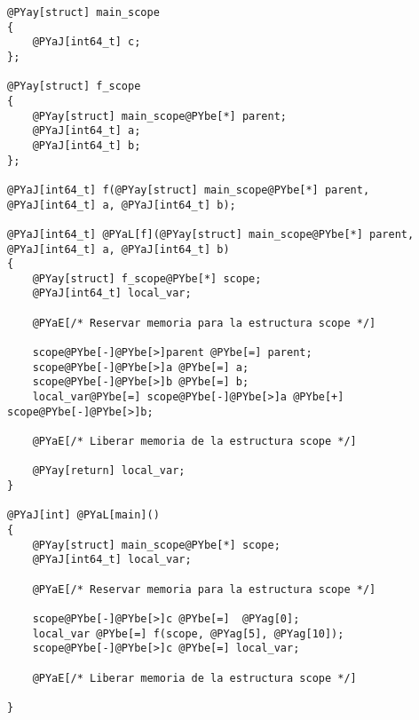 \begin{Verbatim}[commandchars=@\[\]]
@PYay[struct] main_scope
{
    @PYaJ[int64_t] c;
};

@PYay[struct] f_scope
{
    @PYay[struct] main_scope@PYbe[*] parent;
    @PYaJ[int64_t] a;
    @PYaJ[int64_t] b;
};

@PYaJ[int64_t] f(@PYay[struct] main_scope@PYbe[*] parent, @PYaJ[int64_t] a, @PYaJ[int64_t] b);

@PYaJ[int64_t] @PYaL[f](@PYay[struct] main_scope@PYbe[*] parent, @PYaJ[int64_t] a, @PYaJ[int64_t] b)
{
    @PYay[struct] f_scope@PYbe[*] scope;
    @PYaJ[int64_t] local_var;

    @PYaE[/* Reservar memoria para la estructura scope */]

    scope@PYbe[-]@PYbe[>]parent @PYbe[=] parent;
    scope@PYbe[-]@PYbe[>]a @PYbe[=] a;
    scope@PYbe[-]@PYbe[>]b @PYbe[=] b;
    local_var@PYbe[=] scope@PYbe[-]@PYbe[>]a @PYbe[+] scope@PYbe[-]@PYbe[>]b;

    @PYaE[/* Liberar memoria de la estructura scope */]

    @PYay[return] local_var;
}

@PYaJ[int] @PYaL[main]()
{
    @PYay[struct] main_scope@PYbe[*] scope;
    @PYaJ[int64_t] local_var;

    @PYaE[/* Reservar memoria para la estructura scope */]

    scope@PYbe[-]@PYbe[>]c @PYbe[=]  @PYag[0];
    local_var @PYbe[=] f(scope, @PYag[5], @PYag[10]);
    scope@PYbe[-]@PYbe[>]c @PYbe[=] local_var;

    @PYaE[/* Liberar memoria de la estructura scope */]

}
\end{Verbatim}
